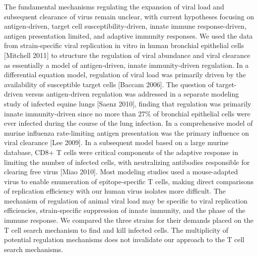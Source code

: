 \documentclass[10pt]{article}
\begin{document}
The fundamental mechanisms regulating the expansion of viral load and subsequent clearance of virus remain unclear, with current hypotheses focusing on antigen-driven, target cell susceptibility-driven, innate immune response-driven, antigen presentation limited, and adaptive immunity responses.  We used the data from strain-specific viral replication in vitro in human bronchial epithelial cells [Mitchell 2011] to structure the regulation of viral abundance and viral clearance as essentially a model of antigen-driven, innate immunity-driven regulation.  In a differential equation model, regulation of viral load was primarily driven by the availability of susceptible target cells [Baccam 2006].  The question of target-driven versus antigen-driven regulation was addressed in a separate modeling study of infected equine lungs [Saenz 2010], finding that regulation was primarily innate immunity-driven since no more than 27\% of bronchial epithelial cells were ever infected during the course of the lung infection.  In a comprehensive model of murine influenza rate-limiting antigen presentation was the primary influence on viral clearance [Lee 2009].  In a subsequent model based on a large murine database, CD8+ T cells were critical components of the adaptive response in limiting the number of infected cells, with neutralizing antibodies responsible for clearing free virus [Miao 2010].   Most modeling studies used a mouse-adapted virus to enable enumeration of epitope-specific T cells, making direct comparisons of replication efficiency with our human virus isolates more difficult.  The mechanism of regulation of animal viral load may be specific to viral replication efficiencies, strain-specific suppression of innate immunity, and the phase of the immune response.  We compared the three strains for their demands placed on the T cell search mechanism to find and kill infected cells. The multiplicity of potential regulation mechanisms does not invalidate our approach to the T cell search mechanisms. 
\end{document}
